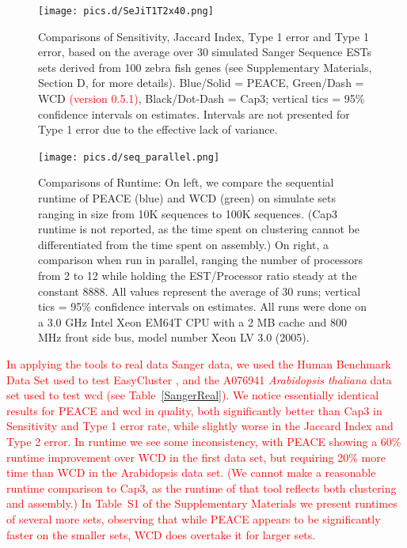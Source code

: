 \documentclass[a4,center,fleqn]{NAR}
\newcommand{\mc}[1]{\textcolor{red}{#1}}
\newcommand{\peace} {{\small PEACE}}
\newcommand{\wcd} {{\small WCD}}
\newcommand{\capthree} {{\small Cap3}}
\newcommand{\easycluster} {{\small EasyCluster}}
\begin{document}
\begin{figure}
  \centerline{\texttt{[image: pics.d/SeJiT1T2x40.png]}}
  \caption{Comparisons of Sensitivity, Jaccard Index, Type 1 error and
    Type 1 error, based on the average over 30 simulated Sanger
    Sequence ESTs sets derived from 100 zebra fish genes (see
    Supplementary Materials, Section D, for more details).  Blue/Solid
    = \peace, Green/Dash = \wcd\/ \mc{(version 0.5.1)}, Black/Dot-Dash =
    \capthree; vertical tics = 95\% confidence intervals on estimates.
    Intervals are not presented for Type 1 error due to the effective
    lack of variance.}\label{SeJiT1T2}
\end{figure}

\begin{figure}
   \centerline{\texttt{[image: pics.d/seq\_parallel.png]}}
   \caption{Comparisons of Runtime: On left, we compare the sequential
     runtime of \peace\/ (blue) and \wcd\/ (green) on simulate sets
     ranging in size from 10K sequences to 100K sequences.  (\capthree\/
     runtime is not reported, as the time spent on clustering cannot
     be differentiated from the time spent on assembly.)  On right,
     a comparison when run in parallel, ranging the number of
     processors from 2 to 12 while holding the EST/Processor ratio
     steady at the constant 8888.  All values represent the average
     of 30 runs; vertical tics = 95\% confidence intervals on
     estimates.  All runs were done on a 3.0 GHz Intel Xeon EM64T CPU with a 2 MB
     cache and 800 MHz front side bus, model number Xeon LV 3.0 (2005).}\label{seq_parallel}
\end{figure}

\mc{In applying the tools to real data Sanger data, we used the Human
  Benchmark Data Set used to test \easycluster\/ \cite{Picardi09}, and
  the A076941 {\it Arabidopsis thaliana} data set used to test wcd\/
  \cite{Hazelhurst08a,Hazelhurst08b} (see Table~\ref{SangerReal}).
  We notice essentially identical results for \peace\/ and wcd\/ in
  quality, both significantly better than \capthree\/ in Sensitivity and Type
  1 error rate, while slightly worse in the Jaccard Index and Type 2
  error.  In runtime we see some inconsistency, with \peace\/ showing a
  60\% runtime improvement over \wcd\/ in the first data set, but requiring 20\%
  more time than \wcd\/ in the Arabidopsis data set.  (We cannot make
  a reasonable runtime comparison to \capthree, as the runtime of that
  tool reflects both clustering and assembly.)  In Table~S1 of the
  Supplementary Materials we present runtimes of several more sets,
  observing that while \peace\/ appears to be significantly 
  faster on the smaller sets, \wcd\/ does overtake it for larger
  sets.}
\end{document}
